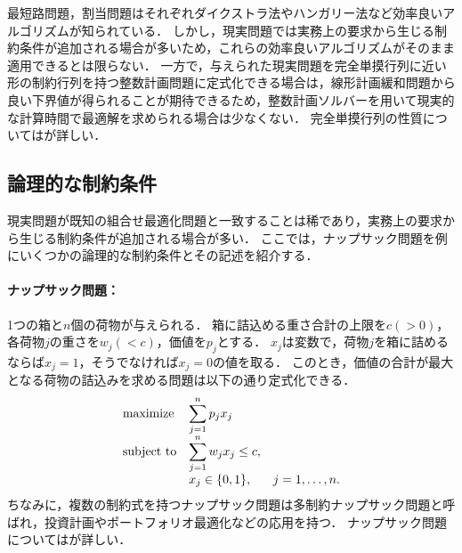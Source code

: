 \documentclass[japanese]{jnlp_1.4}
\begin{document}
最短路問題，割当問題はそれぞれダイクストラ法やハンガリー法など効率良いアルゴリズムが知られている\cite{KorteB2012}．
しかし，現実問題では実務上の要求から生じる制約条件が追加される場合が多いため，これらの効率良いアルゴリズムがそのまま適用できるとは限らない．
一方で，与えられた現実問題を完全単摸行列に近い形の制約行列を持つ整数計画問題に定式化できる場合は，線形計画緩和問題から良い下界値が得られることが期待できるため，整数計画ソルバーを用いて現実的な計算時間で最適解を求められる場合は少なくない．
完全単摸行列の性質については\cite{KorteB2012,SchrijverA1998}が詳しい．


\subsection{論理的な制約条件}
\label{sec:logic}

現実問題が既知の組合せ最適化問題と一致することは稀であり，実務上の要求から生じる制約条件が追加される場合が多い．
ここでは，ナップサック問題を例にいくつかの論理的な制約条件とその記述を紹介する．

\paragraph{ナップサック問題：}
1つの箱と$n$個の荷物が与えられる．
箱に詰込める重さ合計の上限を$c (> 0)$，各荷物$j$の重さを$w_j (< c)$，価値を$p_j$とする．
$x_j$は変数で，荷物$j$を箱に詰めるならば$x_j=1$，そうでなければ$x_j=0$の値を取る．
このとき，価値の合計が最大となる荷物の詰込みを求める問題は以下の通り定式化できる．
\begin{equation}
\begin{array}{lll}
\textnormal{maximize} & \displaystyle\sum_{j=1}^n p_j x_j & \\
\textnormal{subject to} & \displaystyle\sum_{j=1}^n w_j x_j \le c, & \\
 & x_j \in \{ 0, 1 \}, & j=1,\dots,n.
\end{array}
\end{equation}
ちなみに，複数の制約式を持つナップサック問題は多制約ナップサック問題と呼ばれ，投資計画やポートフォリオ最適化などの応用を持つ．
ナップサック問題については\cite{KellererH2004}が詳しい．
\end{document}
